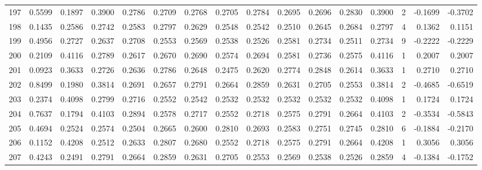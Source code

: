 \begin{tabular}{lrrrrrrrrrrrrrrr}
197 &      0.5599 &  0.1897 &  0.3900 &  0.2786 &  0.2709 &  0.2768 &  0.2705 &  0.2784 &  0.2695 &  0.2696 &   0.2830 &     0.3900 &      2 &                   -0.1699 &                    -0.3702 \\
198 &      0.1435 &  0.2586 &  0.2742 &  0.2583 &  0.2797 &  0.2629 &  0.2548 &  0.2542 &  0.2510 &  0.2645 &   0.2684 &     0.2797 &      4 &                    0.1362 &                     0.1151 \\
199 &      0.4956 &  0.2727 &  0.2637 &  0.2708 &  0.2553 &  0.2569 &  0.2538 &  0.2526 &  0.2581 &  0.2734 &   0.2511 &     0.2734 &      9 &                   -0.2222 &                    -0.2229 \\
200 &      0.2109 &  0.4116 &  0.2789 &  0.2617 &  0.2670 &  0.2690 &  0.2574 &  0.2694 &  0.2581 &  0.2736 &   0.2575 &     0.4116 &      1 &                    0.2007 &                     0.2007 \\
201 &      0.0923 &  0.3633 &  0.2726 &  0.2636 &  0.2786 &  0.2648 &  0.2475 &  0.2620 &  0.2774 &  0.2848 &   0.2614 &     0.3633 &      1 &                    0.2710 &                     0.2710 \\
202 &      0.8499 &  0.1980 &  0.3814 &  0.2691 &  0.2657 &  0.2791 &  0.2664 &  0.2859 &  0.2631 &  0.2705 &   0.2553 &     0.3814 &      2 &                   -0.4685 &                    -0.6519 \\
203 &      0.2374 &  0.4098 &  0.2799 &  0.2716 &  0.2552 &  0.2542 &  0.2532 &  0.2532 &  0.2532 &  0.2532 &   0.2532 &     0.4098 &      1 &                    0.1724 &                     0.1724 \\
204 &      0.7637 &  0.1794 &  0.4103 &  0.2894 &  0.2578 &  0.2717 &  0.2552 &  0.2718 &  0.2575 &  0.2791 &   0.2664 &     0.4103 &      2 &                   -0.3534 &                    -0.5843 \\
205 &      0.4694 &  0.2524 &  0.2574 &  0.2504 &  0.2665 &  0.2600 &  0.2810 &  0.2693 &  0.2583 &  0.2751 &   0.2745 &     0.2810 &      6 &                   -0.1884 &                    -0.2170 \\
206 &      0.1152 &  0.4208 &  0.2512 &  0.2633 &  0.2807 &  0.2680 &  0.2552 &  0.2718 &  0.2575 &  0.2791 &   0.2664 &     0.4208 &      1 &                    0.3056 &                     0.3056 \\
207 &      0.4243 &  0.2491 &  0.2791 &  0.2664 &  0.2859 &  0.2631 &  0.2705 &  0.2553 &  0.2569 &  0.2538 &   0.2526 &     0.2859 &      4 &                   -0.1384 &                    -0.1752 \\

\end{tabular}
